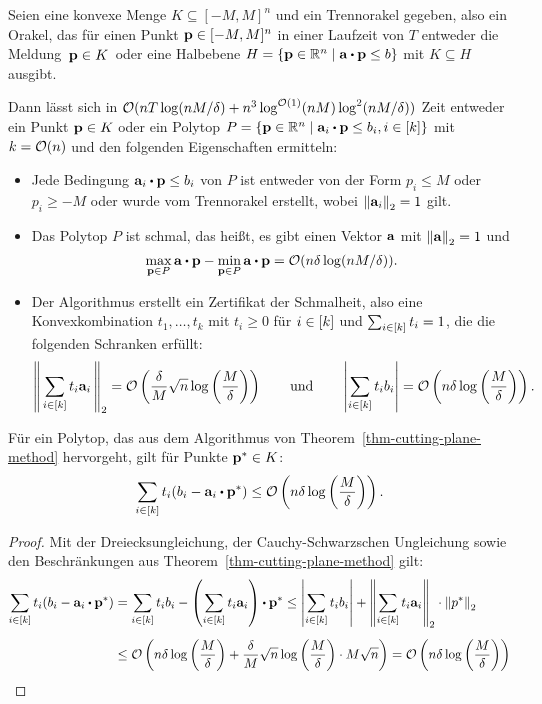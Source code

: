 \iffalse
{}
\begin{theorem}\label{thm-cutting-plane-method}
	Seien eine konvexe Menge $K\subseteq [-M,M]^n$ und ein Trennorakel gegeben, also ein Orakel, das für einen Punkt $\mathbf{p}\in[-M,M]^n$ in einer Laufzeit von $T$ entweder die Meldung \glqq\,$\mathbf{p}\in K$\grqq\ oder eine Halbebene $H=\{ \fp \in\R^n \mid \fa \bcdot \fp \leq b \}$ mit $K\subseteq H$ ausgibt.
	
	Dann lässt sich in $\mathcal{O}(nT\log(nM/\delta) + n^3 \log^{\mathcal{O}(1)}(nM)\log^2(nM/\delta))$ Zeit entweder ein Punkt $\mathbf{p}\in K$ oder ein Polytop $P=\{ \fp\in\R^n \mid \fa_i \bcdot \fp \leq b_i, i\in\first{k} \}$ mit $k=\mathcal{O}(n)$ und den folgenden Eigenschaften ermitteln:
	\begin{itemize}
		\item Jede Bedingung $\fa_i \bcdot \fp \leq b_i$ von $P$ ist entweder von der Form $p_i \leq M$ oder $p_i\geq -M$ oder wurde vom Trennorakel erstellt, wobei $\left\lVert \mathbf{a}_i \right\rVert_2=1$ gilt.
		\item Das Polytop $P$ ist schmal, das heißt, es gibt einen Vektor $\mathbf{a}$ mit $\left\lVert \mathbf{a} \right\rVert_2=1$ und 
	\[
	\max_{\fp\in P} \fa \bcdot \fp - \min_{\fp\in P} \fa \bcdot \fp = \bigO(n\delta \log(nM/\delta)).
	\]
		\item Der Algorithmus erstellt ein Zertifikat der Schmalheit, also eine Konvexkombination $t_1,\dots,t_k$ mit $t_i\geq0$ für $i\in\left[ k \right]$ und $\sum_{i\in\left[ k \right]}t_i = 1$, die die folgenden Schranken erfüllt:
		\[
		\left\lVert \, \sum_{i\in\left[ k \right]} t_i \mathbf{a}_i \,  \right\rVert_2 = \mathcal{O}\left( \frac{\delta}{M} \sqrt{n} \log\left( \frac{M}{\delta} \right) \right)
		\qquad
		\text{und}
		\qquad
		\left\lvert \sum_{i\in\left[ k \right]} t_i b_i \right\rvert = \mathcal{O}\left(n\delta\log\left(\frac{M}{\delta}\right) \right).
		\]
	\end{itemize}
\end{theorem}

\begin{proposition}\label{prop-trivial-bound-thm}
	Für ein Polytop, das aus dem Algorithmus von Theorem~\ref{thm-cutting-plane-method} hervorgeht, gilt für Punkte $\mathbf{p}^*\in K$:
	\[
		\sum_{i\in\first{k}} t_i (b_i - \fa_i \bcdot \fp^*) \leq \bigO\left( n\delta\log\left(\frac{M}{\delta}\right) \right).
	\]
\end{proposition}
\begin{proof}
	Mit der Dreiecksungleichung, der Cauchy-Schwarzschen Ungleichung sowie den Beschränkungen aus Theorem~\ref{thm-cutting-plane-method} gilt:
	\begin{align*}
	\sum_{i\in\first{k}}  t_i (b_i - \fa_i \bcdot \fp^*)
	&= \sum_{i\in\first{k}} t_i b_i
	- \left( \sum_{i\in\first{k}} t_i \fa_i \right)\bcdot \fp^*
	\leq
	\abs{\sum_{i\in\first{k}} t_i b_i}
	+ \norm{\sum_{i\in\first{k}} t_i \fa_i} \cdot \norm{p^*}
	\\[5pt]
	&\leq \bigO\left( 
	n\delta \log\left(\frac{M}{\delta}\right)
	+ \frac{\delta}{M}\sqrt{n}\log\left( \frac{M}{\delta} \right)
	\cdot M \sqrt{n}
	\right)
	= \bigO\left(
	n\delta\log\left( \frac{M}{\delta} \right)
	\right)
	\end{align*}
\end{proof}

